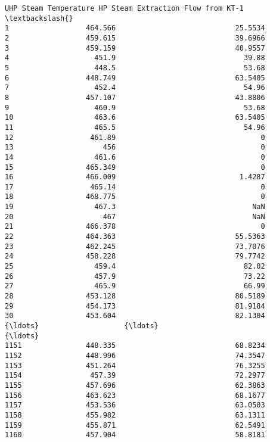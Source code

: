 \documentclass[11pt]{article}
\begin{document}
\begin{tcolorbox}[breakable, size=fbox, boxrule=.5pt, pad at break*=1mm, opacityfill=0]
\begin{Verbatim}[commandchars=\\\{\}]
     UHP Steam Temperature HP Steam Extraction Flow from KT-1  \textbackslash{}
1                  464.566                            25.5534
2                  459.615                            39.6966
3                  459.159                            40.9557
4                    451.9                              39.88
5                    448.5                              53.68
6                  448.749                            63.5405
7                    452.4                              54.96
8                  457.107                            43.8806
9                    460.9                              53.68
10                   463.6                            63.5405
11                   465.5                              54.96
12                  461.89                                  0
13                     456                                  0
14                   461.6                                  0
15                 465.349                                  0
16                 466.009                             1.4287
17                  465.14                                  0
18                 468.775                                  0
19                   467.3                                NaN
20                     467                                NaN
21                 466.378                                  0
22                 464.363                            55.5363
23                 462.245                            73.7076
24                 458.228                            79.7742
25                   459.4                              82.02
26                   457.9                              73.22
27                   465.9                              66.99
28                 453.128                            80.5189
29                 454.173                            81.9184
30                 453.604                            82.1304
{\ldots}                    {\ldots}                                {\ldots}
1151               448.335                            68.8234
1152               448.996                            74.3547
1153               451.264                            76.3255
1154                457.39                            72.2977
1155               457.696                            62.3863
1156               463.623                            68.1677
1157               453.536                            63.0503
1158               455.982                            63.1311
1159               455.871                            62.5491
1160               457.904                            58.8181

\end{Verbatim}
\end{tcolorbox}
\end{document}
